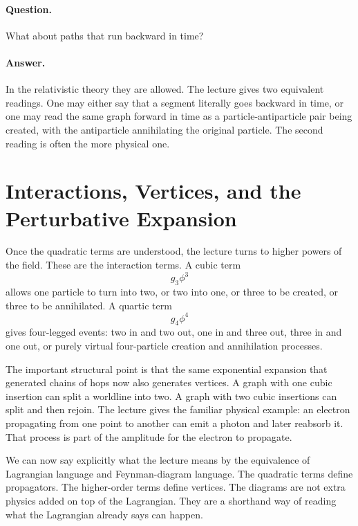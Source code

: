 \paragraph{Question.} What about paths that run backward in time?

\paragraph{Answer.} In the relativistic theory they are allowed. The lecture gives two equivalent readings. One may either say that a segment literally goes backward in time, or one may read the same graph forward in time as a particle-antiparticle pair being created, with the antiparticle annihilating the original particle. The second reading is often the more physical one.

\section{Interactions, Vertices, and the Perturbative Expansion}

Once the quadratic terms are understood, the lecture turns to higher powers of the field. These are the interaction terms. A cubic term
\begin{equation}
g_3\phi^3
\end{equation}
allows one particle to turn into two, or two into one, or three to be created, or three to be annihilated. A quartic term
\begin{equation}
g_4\phi^4
\end{equation}
gives four-legged events: two in and two out, one in and three out, three in and one out, or purely virtual four-particle creation and annihilation processes.

The important structural point is that the same exponential expansion that generated chains of hops now also generates vertices. A graph with one cubic insertion can split a worldline into two. A graph with two cubic insertions can split and then rejoin. The lecture gives the familiar physical example: an electron propagating from one point to another can emit a photon and later reabsorb it. That process is part of the amplitude for the electron to propagate.

We can now say explicitly what the lecture means by the equivalence of Lagrangian language and Feynman-diagram language. The quadratic terms define propagators. The higher-order terms define vertices. The diagrams are not extra physics added on top of the Lagrangian. They are a shorthand way of reading what the Lagrangian already says can happen.

